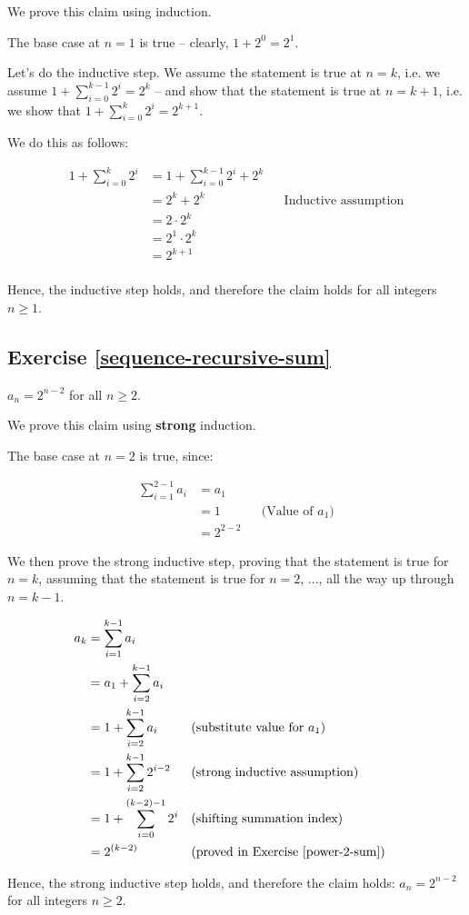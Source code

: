 \documentclass{article}
\begin{document}
We prove this claim using induction. 

The base case at $n = 1$ is true -- clearly, $1 + 2^0 = 2^1$. 

Let's do the inductive step. We assume the statement is true at $n = k$, i.e. we assume $1 + \sum_{i=0}^{k-1} 2^i = 2^k$ -- and show that the statement is true at $n = k + 1$, i.e. we show that $1 + \sum_{i=0}^{k} 2^i = 2^{k+1}$.

We do this as follows: 


\begin{align*}
1 + \sum_{i=0}^{k} 2^i &= 1 + \sum_{i=0}^{k-1} 2^i + 2^k \\
&= 2^k + 2^k && \text{Inductive assumption} \\
&= 2 \cdot 2^k \\
&= 2^1 \cdot 2^k \\
&= 2^{k+1} \\
\end{align*}

Hence, the inductive step holds, and therefore the claim holds for all integers $n \geq 1$. 

\subsection{Exercise \ref{sequence-recursive-sum}}

$a_n = 2^{n-2}$ for all $n \geq 2$. 


We prove this claim using \textbf{strong} induction. 

The base case at $n = 2$ is true, since:

\begin{align*}
\sum_{i=1}^{2-1} a_i &= a_1 \\
&= 1 && \text{(Value of $a_1$)} \\
&= 2^{2-2}
\end{align*}

We then prove the strong inductive step, proving that the statement is true for $n = k$, assuming that the statement is true for $n = 2$, ..., all the way up through $n = k - 1$.

\begin{align*}
a_k &= \sum_{i=1}^{k-1} a_i \\
&= a_1 + \sum_{i=2}^{k-1} a_i \\
&= 1 + \sum_{i=2}^{k-1} a_i && \text{(substitute value for $a_1$)} \\
&= 1 + \sum_{i=2}^{k-1} 2^{i-2} && \text{(strong inductive assumption)} \\
&= 1 + \sum_{i=0}^{(k-2)-1} 2^i && \text{(shifting summation index)} \\
&= 2^{(k-2)} && \text{(proved in Exercise \ref{power-2-sum})}
\end{align*}

Hence, the strong inductive step holds, and therefore the claim holds: $a_n = 2^{n-2}$ for all integers $n \geq 2$. 
\end{document}
